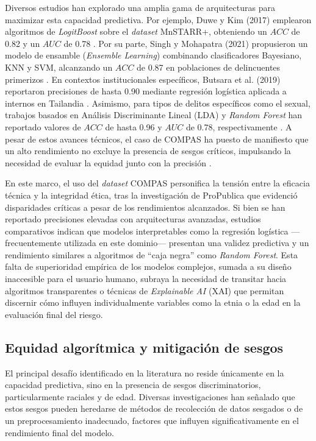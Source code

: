 \documentclass[11pt,a4paper]{article}
\begin{document}
Diversos estudios han explorado una amplia gama de arquitecturas para maximizar esta capacidad predictiva. Por ejemplo, Duwe y Kim (2017) emplearon algoritmos de \textit{LogitBoost} sobre el \textit{dataset} MnSTARR+, obteniendo un $ACC$ de 0.82 y un $AUC$ de 0.78 \cite{duwe2017out}. Por su parte, Singh y Mohapatra (2021) propusieron un modelo de ensamble (\textit{Ensemble Learning}) combinando clasificadores Bayesiano, KNN y SVM, alcanzando un $ACC$ de 0.87 en poblaciones de delincuentes primerizos \cite{singh2021development}. En contextos institucionales específicos, Butsara et al. (2019) reportaron precisiones de hasta 0.90 mediante regresión logística aplicada a internos en Tailandia \cite{butsara2019predicting}. Asimismo, para tipos de delitos específicos como el sexual, trabajos basados en Análisis Discriminante Lineal (LDA) y \textit{Random Forest} han reportado valores de $ACC$ de hasta 0.96 y $AUC$ de 0.78, respectivamente \cite{tollenaar2013method, salo2019predictive}. A pesar de estos avances técnicos, el caso de COMPAS ha puesto de manifiesto que un alto rendimiento no excluye la presencia de sesgos críticos, impulsando la necesidad de evaluar la equidad junto con la precisión \cite{angwin2016machine, karimi2021enhancing}.

En este marco, el uso del \textit{dataset} COMPAS personifica la tensión entre la eficacia técnica y la integridad ética, tras la investigación de ProPublica \cite{angwin2016machine} que evidenció disparidades críticas a pesar de los rendimientos alcanzados. Si bien se han reportado precisiones elevadas con arquitecturas avanzadas, estudios comparativos indican que modelos interpretables como la regresión logística ---frecuentemente utilizada en este dominio--- presentan una validez predictiva y un rendimiento similares a algoritmos de ``caja negra'' como \textit{Random Forest}. Esta falta de superioridad empírica de los modelos complejos, sumada a su diseño inaccesible para el usuario humano, subraya la necesidad de transitar hacia algoritmos transparentes o técnicas de \textit{Explainable AI} (XAI) que permitan discernir cómo influyen individualmente variables como la etnia o la edad en la evaluación final del riesgo.

\subsection{Equidad algorítmica y mitigación de sesgos}

El principal desafío identificado en la literatura no reside únicamente en la capacidad predictiva, sino en la presencia de sesgos discriminatorios, particularmente raciales y de edad. Diversas investigaciones han señalado que estos sesgos pueden heredarse de métodos de recolección de datos sesgados o de un preprocesamiento inadecuado, factores que influyen significativamente en el rendimiento final del modelo. 
\end{document}
